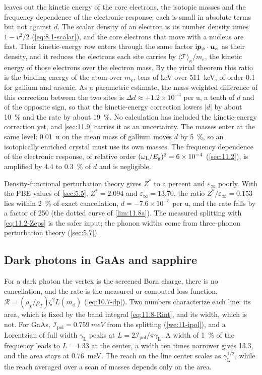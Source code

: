  leaves out the kinetic energy of the core electrons, the isotopic masses and the frequency dependence of the electronic response; each is small in absolute terms but not against $d$. The scalar density of an electron is its number density times $1 - v^2/2$ (\cref{eq:8.1-scalar}), and the core electrons that move with a nucleus are fast. Their kinetic-energy row enters through the same factor $\mathrm{i}\bm{p}_\phi\cdot\bm{u}_\kappa$ as their density, and it reduces the electrons each site carries by $\langle\mathcal{T}\rangle_\kappa/m_e$, the kinetic energy of those electrons over the electron mass. By the virial theorem this ratio is the binding energy of the atom over $m_e$, tens of keV over \SI{511}{keV}, of order 0.1 for gallium and arsenic. As a parametric estimate, the mass-weighted difference of this correction between the two sites is $\Delta d \approx +1.2\times10^{-4}$ per u, a tenth of $d$ and of the opposite sign, so that the kinetic-energy correction lowers $|d|$ by about \SI{10}{\percent} and the rate by about \SI{19}{\percent}. No calculation has included the kinetic-energy correction yet, and \cref{sec:11.9} carries it as an uncertainty. The masses enter at the same level: \SI{0.01}{u} on the mean mass of gallium moves $d$ by \SI{5}{\percent}, so an isotopically enriched crystal must use its own masses. The frequency dependence of the electronic response, of relative order $(\omega_{\mathrm{L}}/E_{\mathrm{g}})^2 = 6\times10^{-4}$ (\cref{sec:11.2}), is amplified by 4.4 to \SI{0.3}{\percent} of $d$ and is negligible.

Density-functional perturbation theory gives $Z^*$ to a percent and $\varepsilon_\infty$ poorly. With the PBE values of \cref{sec:5.5}, $Z^* = 2.094$ and $\varepsilon_\infty = 13.70$, the ratio $Z^*/\varepsilon_\infty = 0.153$ lies within \SI{2}{\percent} of exact cancellation, $d = -7.6\times10^{-5}$ per u, and the rate falls by a factor of 250 (the dotted curve of \cref{lim:11.8a}). The measured splitting with \cref{eq:11.2-Zeps} is the safer input; the phonon widths come from three-phonon perturbation theory (\cref{sec:5.7}).

\subsection{Dark photons in GaAs and sapphire}\label{sec:11.8-dp}

For a dark photon the vertex is the screened Born charge, there is no cancellation, and the rate is the measured or computed loss function, $\mathcal{R} = (\rho_\chi/\rho_T)\zeta^2L(m_\phi)$ (\cref{eq:10.7-dp}). Two numbers characterize each line: its area, which is fixed by the band integral \cref{eq:11.8-Rint}, and its width, which is not. For GaAs, $\mathcal{I}_{\mathrm{pol}} = \SI{0.759}{meV}$ from the splitting (\cref{we:11-ipol}), and a Lorentzian of full width $\gamma_{\mathrm{L}}$ peaks at $L = 2\mathcal{I}_{\mathrm{pol}}/\pi\gamma_{\mathrm{L}}$. A width of \SI{1}{\percent} of the frequency leads to $L = 1.33$ at the center, a width ten times narrower gives 13.3, and the area stays at \SI{0.76}{meV}. The reach on the line center scales as $\gamma_{\mathrm{L}}^{1/2}$, while the reach averaged over a scan of masses depends only on the area.

